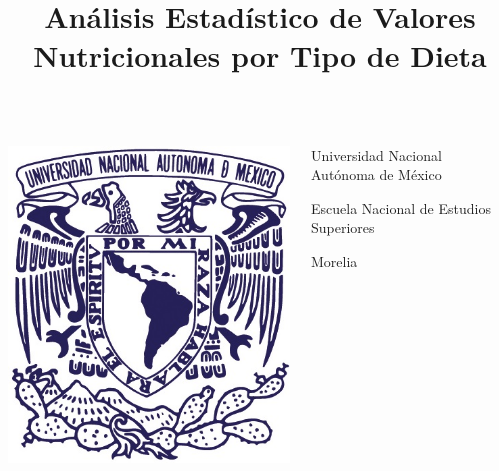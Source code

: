 \documentclass{beamer}
\title[EDA de Valores Nutricionales por Dieta]{Análisis Estadístico de Valores Nutricionales por Tipo de Dieta}
\begin{document}
    \begin{frame}[plain]
        \begin{columns}[T]
            \begin{column}{0.08\textwidth}
                \centering
                \includegraphics[width=\textwidth]{Resources/logo_unam.jpg}
            \end{column}
            \begin{column}{0.60\textwidth}
                \centering
                {\small Universidad Nacional Autónoma de México\par
                Escuela Nacional de Estudios Superiores\par
                Morelia}
            \end{column}
            \begin{column}{0.08\textwidth}
                \centering

\end{column}
\end{columns}
\end{frame}
\end{document}

